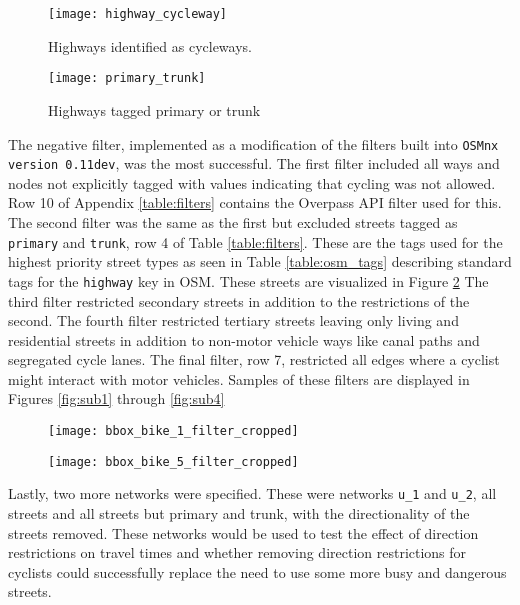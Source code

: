 \begin{figure}
\centering
\texttt{[image: highway\_cycleway]}
\caption{Highways identified as cycleways.}
\label{fig:highway_cycleway}
\end{figure}


\begin{figure}
\centering
\texttt{[image: primary\_trunk]}
\caption{Highways tagged primary or trunk}
\label{fig:primary_trunk}
\end{figure}

The negative filter, implemented as a modification of the filters built into \texttt{OSMnx version 0.11dev}, was the most successful. The first filter included all ways and nodes not explicitly tagged with values indicating that cycling was not allowed. Row 10 of Appendix \ref{table:filters} contains the Overpass API filter used for this. The second filter was the same as the first but excluded streets tagged as \texttt{primary} and \texttt{trunk}, row 4 of  Table \ref{table:filters}. These are the tags used for the highest priority street types as seen in Table \ref{table:osm_tags} describing standard tags for the \texttt{highway} key in OSM. These streets are visualized in Figure \ref{fig:primary_trunk} The third filter restricted secondary streets in addition to the restrictions of the second. The fourth filter restricted tertiary streets leaving only living and residential streets in addition to non-motor vehicle ways like canal paths and segregated cycle lanes. The final filter, row 7, restricted all edges where a cyclist might interact with motor vehicles. Samples of these filters are displayed in Figures \ref{fig:sub1} through \ref{fig:sub4}

\begin{figure}
\centering
\begin{minipage}{.5\textwidth}
  \centering
  \texttt{[image: bbox\_bike\_1\_filter\_cropped]}
  \label{fig:sub1}
\end{minipage}%
\begin{minipage}{.5\textwidth}
  \centering
  \texttt{[image: bbox\_bike\_5\_filter\_cropped]}
  \label{fig:sub2}
\end{minipage}
\end{figure}


Lastly, two more networks were specified. These were networks \texttt{u\_1} and \texttt{u\_2}, all streets and all streets but primary and trunk, with the directionality of the streets removed. These networks would be used to test the effect of direction restrictions on travel times and whether removing direction restrictions for cyclists could successfully replace the need to use some more busy and dangerous streets. 

